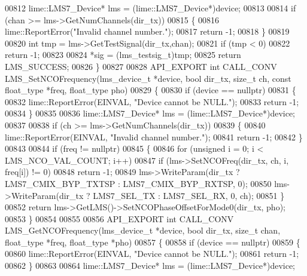 \begin{DoxyCode}
00812     lime::LMS7_Device* lms = (lime::LMS7_Device*)device;
00813 
00814     \textcolor{keywordflow}{if} (chan >= lms->GetNumChannels(dir\_tx))
00815     \{
00816         lime::ReportError(\textcolor{stringliteral}{"Invalid channel number."});
00817         \textcolor{keywordflow}{return} -1;
00818     \}
00819 
00820     \textcolor{keywordtype}{int} tmp = lms->GetTestSignal(dir\_tx,chan);
00821     \textcolor{keywordflow}{if} (tmp < 0)
00822         \textcolor{keywordflow}{return} -1;
00823 
00824     *sig = (lms_testsig_t)tmp;
00825     \textcolor{keywordflow}{return} LMS_SUCCESS;
00826 \}
00827 
00828 API_EXPORT \textcolor{keywordtype}{int} CALL_CONV LMS_SetNCOFrequency(lms_device_t *device, \textcolor{keywordtype}{bool} dir_tx, \textcolor{keywordtype}{size\_t} ch, \textcolor{keyword}{const} 
      float_type *freq, float_type pho)
00829 \{
00830     \textcolor{keywordflow}{if} (device == \textcolor{keyword}{nullptr})
00831     \{
00832         lime::ReportError(EINVAL, \textcolor{stringliteral}{"Device cannot be NULL."});
00833         \textcolor{keywordflow}{return} -1;
00834     \}
00835 
00836     lime::LMS7_Device* lms = (lime::LMS7_Device*)device;
00837 
00838     \textcolor{keywordflow}{if} (ch >= lms->GetNumChannels(dir\_tx))
00839     \{
00840         lime::ReportError(EINVAL, \textcolor{stringliteral}{"Invalid channel number."});
00841         \textcolor{keywordflow}{return} -1;
00842     \}
00843 
00844     \textcolor{keywordflow}{if} (freq != \textcolor{keyword}{nullptr})
00845     \{
00846         \textcolor{keywordflow}{for} (\textcolor{keywordtype}{unsigned} i = 0; i < LMS_NCO_VAL_COUNT; i++)
00847             \textcolor{keywordflow}{if} (lms->SetNCOFreq(dir\_tx, ch, i, freq[i]) != 0)
00848                 \textcolor{keywordflow}{return} -1;
00849         lms->WriteParam(dir\_tx ? LMS7_CMIX_BYP_TXTSP : LMS7_CMIX_BYP_RXTSP, 0);
00850         lms->WriteParam(dir\_tx ? LMS7_SEL_TX : LMS7_SEL_RX, 0, ch);
00851     \}
00852     \textcolor{keywordflow}{return} lms->GetLMS()->SetNCOPhaseOffsetForMode0(dir\_tx, pho);
00853 \}
00854 
00855 
00856 API_EXPORT \textcolor{keywordtype}{int} CALL_CONV LMS_GetNCOFrequency(lms_device_t *device, \textcolor{keywordtype}{bool} dir_tx, \textcolor{keywordtype}{size\_t} 
      chan, float_type *freq, float_type *pho)
00857 \{
00858     \textcolor{keywordflow}{if} (device == \textcolor{keyword}{nullptr})
00859     \{
00860         lime::ReportError(EINVAL, \textcolor{stringliteral}{"Device cannot be NULL."});
00861         \textcolor{keywordflow}{return} -1;
00862     \}
00863 
00864     lime::LMS7_Device* lms = (lime::LMS7_Device*)device;

\end{DoxyCode}
